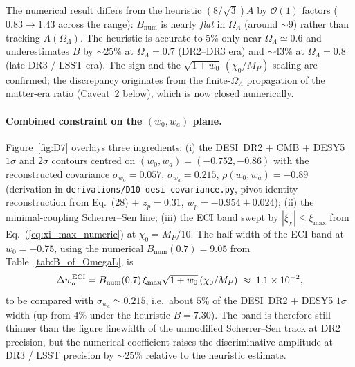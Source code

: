 \documentclass[epjc3,twocolumn]{svjour3}
\begin{document}
The numerical result differs from the heuristic $(8/\sqrt3)A$ by
$\mathcal{O}(1)$ factors ($0.83\to 1.43$ across the range): $B_{\mathrm{num}}$
is nearly \emph{flat} in $\Omega_\Lambda$ (around $\sim 9$) rather than
tracking $A(\Omega_\Lambda)$. The heuristic is accurate to 5\% only near
$\Omega_\Lambda\simeq 0.6$ and underestimates $B$ by $\sim\!25\%$ at
$\Omega_\Lambda=0.7$ (DR2--DR3 era) and $\sim\!43\%$ at
$\Omega_\Lambda=0.8$ (late-DR3 / LSST era). The sign and the
$\sqrt{1+w_0}\,(\chi_0/M_P)$ scaling are confirmed; the discrepancy
originates from the finite-$\Omega_\Lambda$ propagation of the matter-era
ratio (Caveat~2 below), which is now closed numerically.

\paragraph{Combined constraint on the $(w_0,w_a)$ plane.}
Figure~\ref{fig:D7} overlays three ingredients: (i) the DESI~DR2 + CMB + DESY5~\cite{DESY5} $1\sigma$ and
$2\sigma$ contours centred on $(w_0,w_a)=(-0.752,-0.86)$ with the reconstructed covariance
$\sigma_{w_0}=0.057$, $\sigma_{w_a}=0.215$, $\rho(w_0,w_a)=-0.89$ (derivation in
\texttt{derivations/D10-desi-covariance.py}, pivot-identity reconstruction from
\cite{DESIDR2} Eq.~(28) + $z_p=0.31$, $w_p=-0.954\pm0.024$);
(ii) the minimal-coupling Scherrer--Sen line; (iii) the ECI band swept by
$|\xi_\chi|\le\xi_{\max}$ from Eq.~(\ref{eq:xi_max_numeric}) at $\chi_0=M_P/10$.
The half-width of the ECI band at $w_0=-0.75$, using the numerical
$B_{\mathrm{num}}(0.7)=9.05$ from Table~\ref{tab:B_of_OmegaL}, is
\begin{equation}
  \Delta w_a^{\rm ECI}
    = B_{\mathrm{num}}(0.7)\,\xi_{\max}\sqrt{1+w_0}\,(\chi_0/M_P)
    \;\approx\;1.1\times 10^{-2},
\end{equation}
to be compared with $\sigma_{w_a}\!\simeq\!0.215$, i.e.\ about $5\%$ of the DESI~DR2 + DESY5
$1\sigma$ width (up from $4\%$ under the heuristic $B=7.30$). The band is therefore
still thinner than the figure linewidth of the unmodified Scherrer--Sen track at DR2
precision, but the numerical coefficient raises the discriminative amplitude at DR3 / LSST
precision by $\sim\!25\%$ relative to the heuristic estimate.
\end{document}
